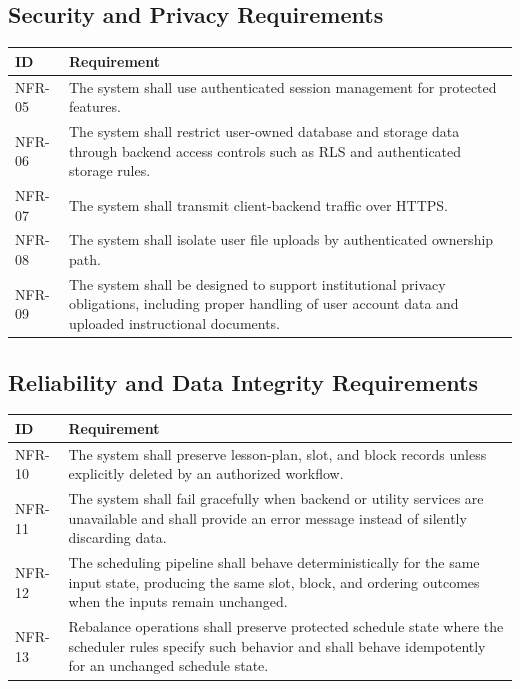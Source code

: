 \documentclass[12pt]{article}
\begin{document}
\subsection{Security and Privacy Requirements}

\begin{longtable}{|L{2.3cm}|L{11.3cm}|}
\hline
\textbf{ID} & \textbf{Requirement} \\
\hline
NFR-05 & The system shall use authenticated session management for protected features. \\
\hline
NFR-06 & The system shall restrict user-owned database and storage data through backend access controls such as RLS and authenticated storage rules. \\
\hline
NFR-07 & The system shall transmit client-backend traffic over HTTPS. \\
\hline
NFR-08 & The system shall isolate user file uploads by authenticated ownership path. \\
\hline
NFR-09 & The system shall be designed to support institutional privacy obligations, including proper handling of user account data and uploaded instructional documents. \\
\hline
\end{longtable}

\subsection{Reliability and Data Integrity Requirements}

\begin{longtable}{|L{2.3cm}|L{11.3cm}|}
\hline
\textbf{ID} & \textbf{Requirement} \\
\hline
NFR-10 & The system shall preserve lesson-plan, slot, and block records unless explicitly deleted by an authorized workflow. \\
\hline
NFR-11 & The system shall fail gracefully when backend or utility services are unavailable and shall provide an error message instead of silently discarding data. \\
\hline
NFR-12 & The scheduling pipeline shall behave deterministically for the same input state, producing the same slot, block, and ordering outcomes when the inputs remain unchanged. \\
\hline
NFR-13 & Rebalance operations shall preserve protected schedule state where the scheduler rules specify such behavior and shall behave idempotently for an unchanged schedule state. \\
\hline
\end{longtable}
\end{document}
